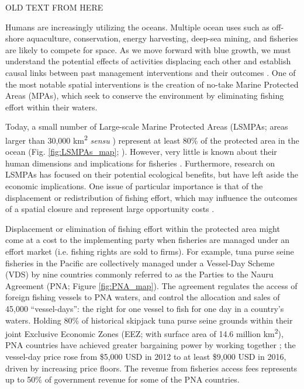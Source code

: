 \documentclass[12pt]{article}
\begin{document}
OLD TEXT FROM HERE

Humans are increasingly utilizing the oceans. Multiple ocean uses such as off-shore aquaculture, conservation, energy harvesting, deep-sea mining, and fisheries are likely to compete for space. As we move forward with blue growth, we must understand the potential effects of activities displacing each other and establish causal links between past management interventions and their outcomes \cite{burgess_2018}. One of the most notable spatial interventions is the creation of no-take Marine Protected Areas (MPAs), which seek to conserve the environment by eliminating fishing effort within their waters.

Today, a small number of Large-scale Marine Protected Areas (LSMPAs; areas larger than 30,000 km\textsuperscript{2} \emph{sensu} \cite{desanto_2013}) represent at least 80\% of the protected area in the ocean (Fig. \ref{fig:LSMPAs_map}; \cite{toonen_2013}). However, very little is known about their human dimensions and implications for fisheries \cite{gray_2017}. Furthermore, research on LSMPAs has focused on their potential ecological benefits, but have left aside the economic implications. One issue of particular importance is that of the displacement or redistribution of fishing effort, which may influence the outcomes of a spatial closure and represent large opportunity costs \cite{smith_2003,smith_2010}.

Displacement or elimination of fishing effort within the protected area might come at a cost to the implementing party when fisheries are managed under an effort market (i.e. fishing rights are sold to firms). For example, tuna purse seine fisheries in the Pacific are collectively managed under a Vessel-Day Scheme (VDS) by nine countries commonly referred to as the Parties to the Nauru Agreement (PNA; Figure \ref{fig:PNA_map}). The agreement regulates the access of foreign fishing vessels to PNA waters, and control the allocation and sales of 45,000 ``vessel-days'': the right for one vessel to fish for one day in a country's waters. Holding 80\% of historical skipjack tuna purse seine grounds within their joint Exclusive Economic Zones (EEZ; with surface area of  14.6 million km\textsuperscript{2}), PNA countries have achieved greater bargaining power by working together \cite{havice_2010}; the vessel-day price rose from \$5,000 USD in 2012 to at least \$9,000 USD in 2016, driven by increasing price floors. The revenue from fisheries access fees represents up to 50\% of government revenue for some of the PNA countries.
\end{document}
